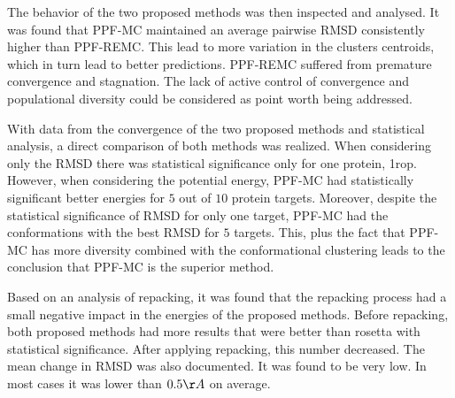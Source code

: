 The behavior of the two proposed methods was then inspected and analysed. It was
found that PPF-MC maintained an average pairwise RMSD consistently higher than PPF-REMC.
This lead to more variation in the clusters centroids, which in turn lead to
better predictions. PPF-REMC suffered from premature convergence and stagnation.
The lack of active control of convergence and populational diversity could be
considered as point worth being addressed.

With data from the convergence of the two proposed methods and statistical
analysis, a direct comparison of both methods was realized. When considering
only the RMSD there was statistical significance only for one protein, 1rop.
However, when considering the potential energy, PPF-MC had statistically
significant better energies for $5$ out of $10$ protein targets. Moreover,
despite the statistical significance of RMSD for only one target, PPF-MC had
the conformations with the best RMSD for $5$ targets. This, plus the fact that
PPF-MC has more diversity combined with the conformational clustering leads to
the conclusion that PPF-MC is the superior method. 

Based on an analysis of repacking, it was found that
the repacking process had a small negative impact in the energies of the
proposed methods. Before repacking, both proposed methods had more results that
were better than rosetta with statistical significance. After applying repacking,
this number decreased. The mean change in RMSD was also documented. It was found
to be very low. In most cases it was lower than $0.5\AA$ on average.

